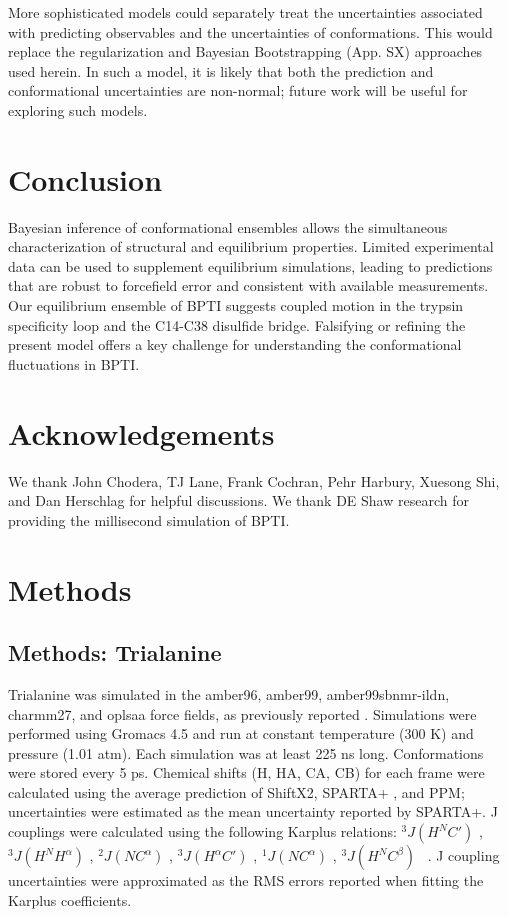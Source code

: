 \documentclass[journal=jacsat,manuscript=article]{achemso}
\begin{document}
More sophisticated models could separately treat the uncertainties associated with predicting observables and the uncertainties of conformations.  This would replace the regularization and Bayesian Bootstrapping (App. SX) approaches used herein.  In such a model, it is likely that both the prediction and conformational uncertainties are non-normal; future work will be useful for exploring such models.  


\section{Conclusion}

Bayesian inference of conformational ensembles allows the simultaneous characterization of structural and equilibrium properties.  Limited experimental data can be used to supplement equilibrium simulations, leading to predictions that are robust to forcefield error and consistent with available measurements.  Our equilibrium ensemble of BPTI suggests coupled motion in the trypsin specificity loop and the C14-C38 disulfide bridge.  Falsifying or refining the present model offers a key challenge for understanding the conformational fluctuations in BPTI.

\section{Acknowledgements}

We thank John Chodera, TJ Lane, Frank Cochran, Pehr Harbury, Xuesong Shi, and Dan Herschlag for helpful discussions.  We thank DE Shaw research for providing the millisecond simulation of BPTI.  

\section{Methods}

\subsection{Methods: Trialanine}

Trialanine was simulated in the amber96\cite{kollman1996}, amber99\cite{wang2000}, amber99sbnmr-ildn\cite{li2010}, charmm27\cite{mackerell2004extending,bjelkmar2010implementation}, and oplsaa\cite{kaminski2001evaluation} force fields, as previously reported \cite{beauchamp2012protein}.  Simulations were performed using Gromacs 4.5 \cite{hess2008} and run at constant temperature (300 K) and pressure (1.01 atm).  Each simulation was at least 225 ns long.  Conformations were stored every 5 ps.  Chemical shifts (H, HA, CA, CB) for each frame were calculated using the average prediction of ShiftX2\cite{han2011shiftx2}, SPARTA+ \cite{Shen2010}, and PPM\cite{li2012ppm}; uncertainties were estimated as the mean uncertainty reported by SPARTA+. J couplings were calculated using the following Karplus relations: $^3J(H^N C')$ \cite{Schmidt1999}, $^3J(H^N H^\alpha)$ \cite{vogeli2007limits}, $^2J(N C^\alpha)$ \cite{Graf2007}, $^3J(H^\alpha C')$ \cite{Schmidt1999}, $^1J(N C^\alpha)$ \cite{Graf2007}, $^3J(H^N C^\beta)$ \
\cite{vogeli2007limits}.  J coupling uncertainties were approximated as the RMS errors reported when fitting the Karplus coefficients.  



\end{document}
